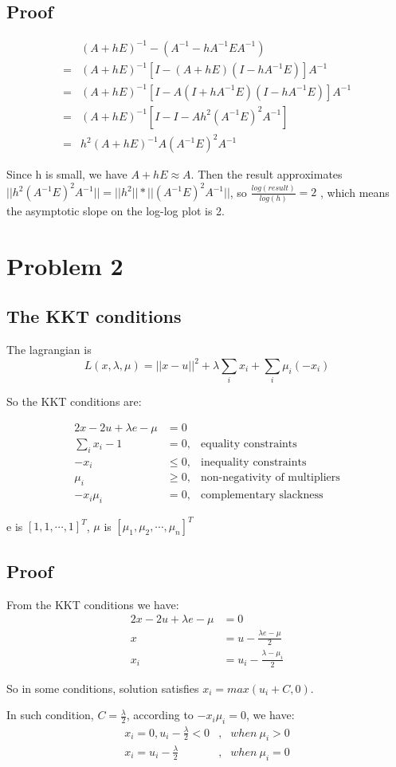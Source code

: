 \documentclass[a4paper, 11pt]{article}
\begin{document}
\par
\subsection*{Proof}

\begin{align*}
	  & (A+hE)^{-1}-(A^{-1}-hA^{-1}EA^{-1})  \\
	= & (A+hE)^{-1}[I-(A+hE)(I-hA^{-1}E)]A^{-1} \\
	= & (A+hE)^{-1}[I-A(I+hA^{-1}E)(I-hA^{-1}E)]A^{-1} \\
	= & (A+hE)^{-1}[I-I-Ah^2(A^{-1}E)^2A^{-1}] \\
	= & h^2(A+hE)^{-1}A(A^{-1}E)^2A^{-1}
\end{align*}

Since h is small, we have $A+hE \approx A$. Then the result approximates $||h^2(A^{-1}E)^2A^{-1}||=||h^2|| *||(A^{-1}E)^2A^{-1}||$, so $\frac{log(result)}{log(h)}=2$ , which means the asymptotic slope on the log-log plot is 2.

\section*{Problem 2}
\subsection*{The KKT conditions}
The lagrangian is
$$
L(x, \lambda, \mu) = ||x-u||^2 + \lambda\sum_i x_i+ \sum_i \mu_i(-x_i)
$$

So the KKT conditions are:

\begin{align*}
  2x-2u+\lambda e-\mu &= 0 \\
  \sum_i x_i - 1      &= 0,     & \mbox{equality constraints}\\
  -x_i                & \leq 0, & \mbox{inequality constraints}\\
  \mu_i               & \geq 0, & \mbox{non-negativity of multipliers}\\
  -x_i \mu_i          &= 0,     & \mbox{complementary slackness}
\end{align*}

e is $[1, 1, \cdots , 1]^T$, $\mu$ is $[\mu_1, \mu_2, \cdots, \mu_n]^T$
\subsection*{Proof}
From the KKT conditions we have:
\begin{align*}
	2x-2u+\lambda e-\mu & = 0 \\
	                 x & = u - \frac{\lambda e-\mu}{2} \\
	               x_i & = u_i - \frac{\lambda - \mu_i}{2}
\end{align*}

So in some conditions, solution satisfies $x_i = max(u_i + C, 0)$.

In such condition, $C=\frac{\lambda}{2}$, according to $-x_i\mu_i = 0$, we have:
\begin{align*}
 x_i=0, u_i-\frac{\lambda}{2} < 0 &, &when\ \mu_i > 0 \\
  x_i = u_i-\frac{\lambda}{2}&, &when\ \mu_i = 0 
\end{align*}
\end{document}
